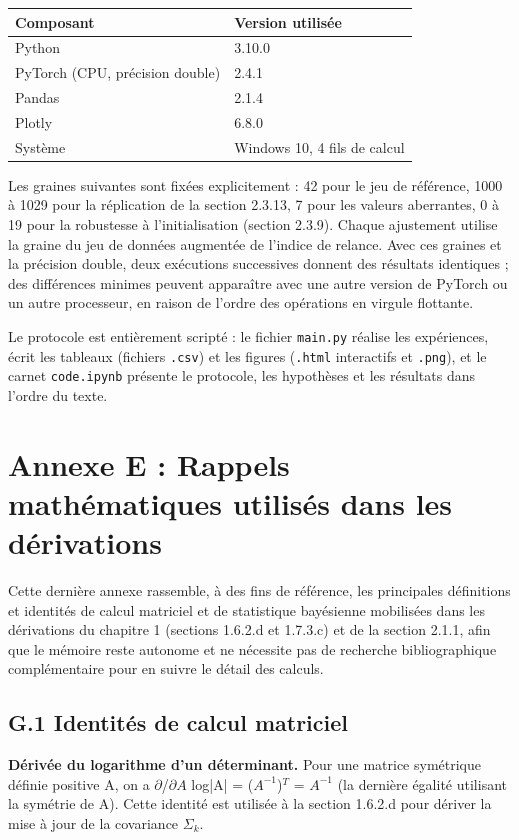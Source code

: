 \begin{table}[H]
\centering
\small
\setlength{\tabcolsep}{0.14cm}
\begin{tabular}{|p{7.42cm}|p{7.42cm}|}
\hline
\textbf{Composant} & \textbf{Version utilisée} \\
\hline
Python & 3.10.0 \\
\hline
PyTorch (CPU, précision double) & 2.4.1 \\
\hline
Pandas & 2.1.4 \\
\hline
Plotly & 6.8.0 \\
\hline
Système & Windows 10, 4 fils de calcul \\
\hline
\end{tabular}
\end{table}
Les graines suivantes sont fixées explicitement : 42 pour le jeu de référence, 1000 à 1029 pour la réplication de la section 2.3.13, 7 pour les valeurs aberrantes, 0 à 19 pour la robustesse à l'initialisation (section 2.3.9). Chaque ajustement utilise la graine du jeu de données augmentée de l'indice de relance. Avec ces graines et la précision double, deux exécutions successives donnent des résultats identiques ; des différences minimes peuvent apparaître avec une autre version de PyTorch ou un autre processeur, en raison de l'ordre des opérations en virgule flottante.

Le protocole est entièrement scripté : le fichier \texttt{main.py} réalise les expériences, écrit les tableaux (fichiers \texttt{.csv}) et les figures (\texttt{.html} interactifs et \texttt{.png}), et le carnet \texttt{code.ipynb} présente le protocole, les hypothèses et les résultats dans l'ordre du texte.

\section*{Annexe E : Rappels mathématiques utilisés dans les dérivations}
Cette dernière annexe rassemble, à des fins de référence, les principales définitions et identités de calcul matriciel et de statistique bayésienne mobilisées dans les dérivations du chapitre 1 (sections 1.6.2.d et 1.7.3.c) et de la section 2.1.1, afin que le mémoire reste autonome et ne nécessite pas de recherche bibliographique complémentaire pour en suivre le détail des calculs.

\subsection*{G.1 Identités de calcul matriciel}
\textbf{Dérivée du logarithme d'un déterminant. }Pour une matrice symétrique définie positive A, on a $\partial $/$\partial A$ log|A| = ($A^{-1}$)$^{T}$ = $A^{-1}$ (la dernière égalité utilisant la symétrie de A). Cette identité est utilisée à la section 1.6.2.d pour dériver la mise à jour de la covariance $\Sigma _{k}$.

